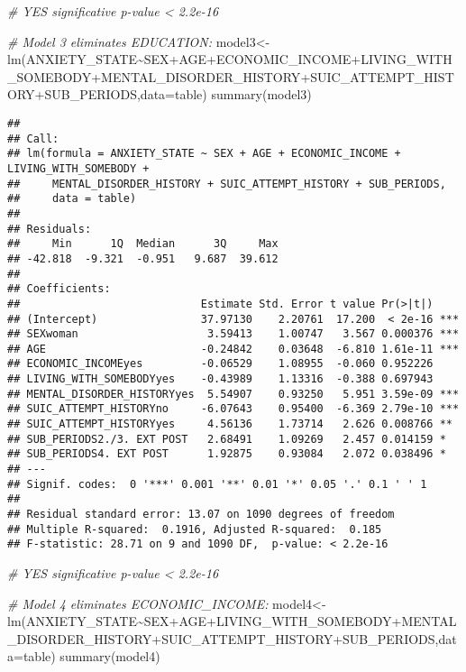 \documentclass[
]{book}
\newenvironment{Shaded}{\begin{snugshade}}{\end{snugshade}}
\newcommand{\AttributeTok}[1]{\textcolor[rgb]{0.77,0.63,0.00}{#1}}
\newcommand{\CommentTok}[1]{\textcolor[rgb]{0.56,0.35,0.01}{\textit{#1}}}
\newcommand{\FunctionTok}[1]{\textcolor[rgb]{0.00,0.00,0.00}{#1}}
\newcommand{\NormalTok}[1]{#1}
\newcommand{\OtherTok}[1]{\textcolor[rgb]{0.56,0.35,0.01}{#1}}
\newcommand{\SpecialCharTok}[1]{\textcolor[rgb]{0.00,0.00,0.00}{#1}}
\begin{document}
\begin{Shaded}
\begin{Highlighting}[]
\CommentTok{\# YES significative p{-}value \textless{} 2.2e{-}16}

\CommentTok{\# Model 3 eliminates EDUCATION:}
\NormalTok{model3}\OtherTok{\textless{}{-}}\FunctionTok{lm}\NormalTok{(ANXIETY\_STATE}\SpecialCharTok{\textasciitilde{}}\NormalTok{SEX}\SpecialCharTok{+}\NormalTok{AGE}\SpecialCharTok{+}\NormalTok{ECONOMIC\_INCOME}\SpecialCharTok{+}\NormalTok{LIVING\_WITH\_SOMEBODY}\SpecialCharTok{+}\NormalTok{MENTAL\_DISORDER\_HISTORY}\SpecialCharTok{+}\NormalTok{SUIC\_ATTEMPT\_HISTORY}\SpecialCharTok{+}\NormalTok{SUB\_PERIODS,}\AttributeTok{data=}\NormalTok{table)}
\FunctionTok{summary}\NormalTok{(model3)}
\end{Highlighting}
\end{Shaded}

\begin{verbatim}
## 
## Call:
## lm(formula = ANXIETY_STATE ~ SEX + AGE + ECONOMIC_INCOME + LIVING_WITH_SOMEBODY + 
##     MENTAL_DISORDER_HISTORY + SUIC_ATTEMPT_HISTORY + SUB_PERIODS, 
##     data = table)
## 
## Residuals:
##     Min      1Q  Median      3Q     Max 
## -42.818  -9.321  -0.951   9.687  39.612 
## 
## Coefficients:
##                            Estimate Std. Error t value Pr(>|t|)    
## (Intercept)                37.97130    2.20761  17.200  < 2e-16 ***
## SEXwoman                    3.59413    1.00747   3.567 0.000376 ***
## AGE                        -0.24842    0.03648  -6.810 1.61e-11 ***
## ECONOMIC_INCOMEyes         -0.06529    1.08955  -0.060 0.952226    
## LIVING_WITH_SOMEBODYyes    -0.43989    1.13316  -0.388 0.697943    
## MENTAL_DISORDER_HISTORYyes  5.54907    0.93250   5.951 3.59e-09 ***
## SUIC_ATTEMPT_HISTORYno     -6.07643    0.95400  -6.369 2.79e-10 ***
## SUIC_ATTEMPT_HISTORYyes     4.56136    1.73714   2.626 0.008766 ** 
## SUB_PERIODS2./3. EXT POST   2.68491    1.09269   2.457 0.014159 *  
## SUB_PERIODS4. EXT POST      1.92875    0.93084   2.072 0.038496 *  
## ---
## Signif. codes:  0 '***' 0.001 '**' 0.01 '*' 0.05 '.' 0.1 ' ' 1
## 
## Residual standard error: 13.07 on 1090 degrees of freedom
## Multiple R-squared:  0.1916, Adjusted R-squared:  0.185 
## F-statistic: 28.71 on 9 and 1090 DF,  p-value: < 2.2e-16
\end{verbatim}

\begin{Shaded}
\begin{Highlighting}[]
\CommentTok{\# YES significative p{-}value \textless{} 2.2e{-}16}

\CommentTok{\# Model 4 eliminates ECONOMIC\_INCOME:}
\NormalTok{model4}\OtherTok{\textless{}{-}}\FunctionTok{lm}\NormalTok{(ANXIETY\_STATE}\SpecialCharTok{\textasciitilde{}}\NormalTok{SEX}\SpecialCharTok{+}\NormalTok{AGE}\SpecialCharTok{+}\NormalTok{LIVING\_WITH\_SOMEBODY}\SpecialCharTok{+}\NormalTok{MENTAL\_DISORDER\_HISTORY}\SpecialCharTok{+}\NormalTok{SUIC\_ATTEMPT\_HISTORY}\SpecialCharTok{+}\NormalTok{SUB\_PERIODS,}\AttributeTok{data=}\NormalTok{table)}
\FunctionTok{summary}\NormalTok{(model4)}
\end{Highlighting}
\end{Shaded}
\end{document}
